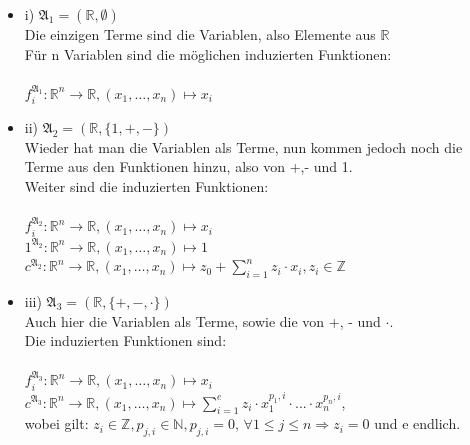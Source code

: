 \documentclass[a4paper]{scrartcl}
\begin{document}
    \begin{itemize}
        \item i) $\mathfrak{A}_1 = (\mathds{R}, \emptyset)$\\
            Die einzigen Terme sind die Variablen, also Elemente aus $\mathds{R}$\\
            Für n Variablen sind die möglichen induzierten Funktionen:\\
            \\$f_i^{\mathfrak{A}_1}: \mathds{R}^n \rightarrow \mathds{R}, (x_1,\dots,x_n) \mapsto x_i$\\

        \item ii) $\mathfrak{A}_2 = (\mathds{R}, \{1, +, -\})$\\
            Wieder hat man die Variablen als Terme, nun kommen jedoch noch die Terme aus den Funktionen hinzu,
            also von +,- und 1.\\
            Weiter sind die induzierten Funktionen:\\
            \\$f_i^{\mathfrak{A}_2}: \mathds{R}^n \rightarrow \mathds{R}, (x_1,\dots,x_n) \mapsto x_i$\\
            $1^{\mathfrak{A}_2}: \mathds{R}^n \rightarrow \mathds{R}, (x_1,\dots,x_n) \mapsto 1$\\
            $c^{\mathfrak{A}_2}: \mathds{R}^n \rightarrow \mathds{R}, (x_1,\dots,x_n) \mapsto z_0 + \sum^{n}_{i=1} z_i \cdot x_i, z_i \in \mathds{Z}$\\

        \item iii) $\mathfrak{A}_3 = (\mathds{R}, \{+, -, \cdot\})$\\
            Auch hier die Variablen als Terme, sowie die von +, - und $\cdot$.\\
            Die induzierten Funktionen sind:\\
            \\$f_i^{\mathfrak{A}_3}: \mathds{R}^n \rightarrow \mathds{R}, (x_1,\dots,x_n) \mapsto x_i$\\
            $c^{\mathfrak{A}_3}: \mathds{R}^n \rightarrow \mathds{R}, (x_1,\dots,x_n) \mapsto \sum^{e}_{i=1} z_i \cdot x_1^{p_1,i} \cdot ... \cdot x_n^{p_n,i}$,\\
            wobei gilt: $z_i \in \mathds{Z}, p_{j,i} \in \mathds{N}, p_{j,i} = 0 \text{,     } \forall 1 \leq j \leq n \Rightarrow z_i = 0$ und e endlich.\\
    \end{itemize}
\end{document}
